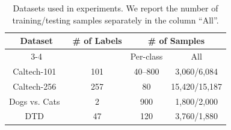 

\begin{table}[!t]
\caption{Datasets used in experiments. We report the number of training/testing samples separately in the column ``All''.}
\label{table-datasets}
\centering
\footnotesize
\begin{tabular}{@{}cccc@{}}
\toprule
\multirow{2}{*}{\textbf{Dataset}} & \multirow{2}{*}{\textbf{\# of Labels}} & \multicolumn{2}{c}{\textbf{\# of Samples}} \\ \cmidrule(l){3-4} 
                         &                              & Per-class     & All              \\ \midrule
Caltech-101~\cite{c101}              & 101                          & 40--800       & 3,060/6,084      \\
Caltech-256~\cite{c256}              & 257                          & 80            & 15,420/15,187    \\
Dogs vs. Cats~\cite{Dvg}            & 2                            & 900           & 1,800/2,000      \\
DTD~\cite{dtd}                      & 47                           & 120           & 3,760/1,880      \\ \bottomrule
\end{tabular}


\end{table}
